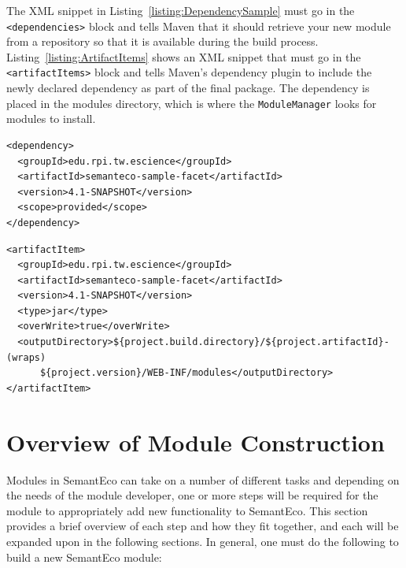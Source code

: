 \documentclass[letterpaper]{report}
\begin{document}
The XML snippet in Listing~\ref{listing:DependencySample} must go in the \texttt{<dependencies>} block and tells Maven that it should retrieve your new module from a repository so that it is available during the build process. Listing~\ref{listing:ArtifactItems} shows an XML snippet that must go in the \texttt{<artifactItems>} block and tells Maven's dependency plugin to include the newly declared dependency as part of the final package. The dependency is placed in the modules directory, which is where the \texttt{ModuleManager} looks for modules to install.

\begin{lstlisting}[float,style=XML,caption=Sample Dependency Entry,label=listing:DependencySample]
<dependency>
  <groupId>edu.rpi.tw.escience</groupId>
  <artifactId>semanteco-sample-facet</artifactId>
  <version>4.1-SNAPSHOT</version>
  <scope>provided</scope>
</dependency>
\end{lstlisting}


\begin{lstlisting}[float,style=XML,caption=Sample ArtifactItems Entry,label=listing:ArtifactItems]
<artifactItem>
  <groupId>edu.rpi.tw.escience</groupId>
  <artifactId>semanteco-sample-facet</artifactId>
  <version>4.1-SNAPSHOT</version>
  <type>jar</type>
  <overWrite>true</overWrite>
  <outputDirectory>${project.build.directory}/${project.artifactId}-  (wraps)
      ${project.version}/WEB-INF/modules</outputDirectory>
</artifactItem>
\end{lstlisting}

\section{Overview of Module Construction}

Modules in SemantEco can take on a number of different tasks and depending on the needs of the module developer, one or more steps will be required for the module to appropriately add new functionality to SemantEco. This section provides a brief overview of each step and how they fit together, and each will be expanded upon in the following sections. In general, one must do the following to build a new SemantEco module:
\end{document}
